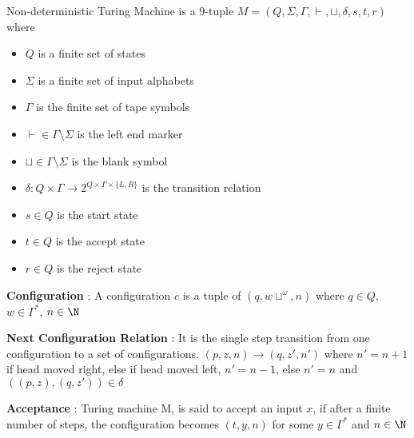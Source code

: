 Non-deterministic Turing Machine is a $9$-tuple $M = (Q, \Sigma, \Gamma, \vdash, \sqcup, \delta, s, t, r)$ where

\begin{itemize}
    \item $Q$ is a finite set of states
    \item $\Sigma$ is a finite set of input alphabets
    \item $\Gamma$ is the finite set of tape symbols
    \item $\vdash \in \Gamma \setminus \Sigma$ is the left end marker
    \item $\sqcup \in \Gamma \setminus \Sigma$ is the blank symbol
    \item $\delta : Q \times \Gamma  \rightarrow 2 ^ {Q \times \Gamma \times \{L, R\}}$ is the transition relation
    \item $s \in Q$ is the start state
    \item $t \in Q$ is the accept state
    \item $r \in Q$ is the reject state
\end{itemize}

\textbf{Configuration} :
\newline
A configuration $c$ is a tuple of $(q, w\sqcup ^ \omega, n)$ where $q \in Q$, $w \in \Gamma^*$, $n \in \N$

\textbf{Next Configuration Relation} :
\newline
It is the single step transition from one configuration to a set of configurations.
$(p, z, n) \rightarrow (q, z', n')$ where 
$ n' = n + 1$ if head moved right, else if head moved left, $n' = n - 1$, else $n' = n$ and $((p, z), (q, z')) \in \delta$

\textbf{Acceptance} : 
\newline
Turing machine M, is said to accept an input $x$, if after a finite number of steps, the configuration becomes $(t, y, n)$ for some $y \in \Gamma ^ *$ and $n \in \N$



